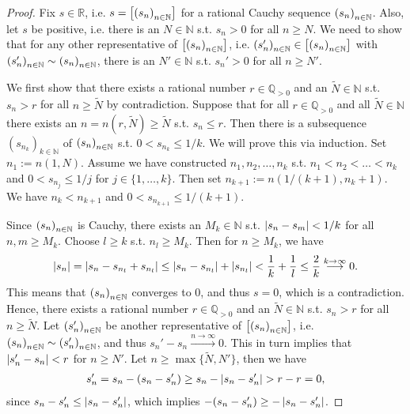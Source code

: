 \begin{proof}
	Fix $s\in\mathbb R$, i.e. $s = \left[\seq[s_n]\right]$ for a rational Cauchy sequence $\seq[s_n]$. Also, let $s$ be positive, i.e. there is an $N\in\mathbb N$ s.t. $s_n > 0$ for all $n\geq N$. We need to show that for any other representative of $\left[\seq[s_n]\right]$, i.e. $\seq[s_n']\in\left[\seq[s_n]\right]$ with $\seq[s_n'] \sim \seq[s_n]$, there is an $N'\in\mathbb N$ s.t. $s_n' > 0$ for all $n\geq N'$.
	
	We first show that there exists a rational number $r\in\mathbb Q_{> 0}$ and an $\tilde{N}\in\mathbb N$ s.t. $s_n > r$ for all $n\geq \tilde{N}$ by contradiction. Suppose that for all $r\in\mathbb Q_{> 0}$ and all $\tilde{N}\in\mathbb N$ there exists an $n = n(r, \tilde{N})\geq \tilde{N}$ s.t. $s_n \leq r$. Then there is a subsequence $\left(s_{n_k}\right)_{k\in\mathbb N}$ of $\seq[s_n]$ s.t. $0 < s_{n_k} \leq 1/k$. We will prove this via induction. Set $n_1 := n(1, N)$. Assume we have constructed $n_1, n_2, \dots, n_k$ s.t. $n_1 < n_2 < \dots < n_k$ and $0 < s_{n_j} \leq 1/j$ for $j\in\{1, \dots, k\}$. Then set $n_{k + 1} := n(1/(k + 1), n_{k} + 1)$. We have $n_k < n_{k + 1}$ and $0 < s_{n_{k + 1}} \leq 1/(k +1)$. 
	
	Since $\seq[s_n]$ is Cauchy, there exists an $M_k\in\mathbb N$ s.t. $\abs{s_n - s_m} < 1/k$ for all $n, m\geq M_k$. Choose $l\geq k$ s.t. $n_l \geq M_k$. Then for $n\geq M_k$, we have
	\begin{align}
		\abs{s_n} = \abs{s_n - s_{n_l} + s_{n_l}} \leq \abs{s_n - s_{n_l}} + \abs{s_{n_l}} < \frac{1}{k} + \frac{1}{l} \leq \frac{2}{k} \overset{k\to\infty}{\longrightarrow} 0.
	\end{align}
	This means that $\seq[s_n]$ converges to $0$, and thus $s = 0$, which is a contradiction. Hence, there exists a rational number $r\in\mathbb Q_{> 0}$ and an $\tilde{N}\in\mathbb N$ s.t. $s_n > r$ for all $n\geq \tilde{N}$. Let $\seq[s_n']$ be another representative of $\left[\seq[s_n]\right]$, i.e. $\seq[s_n] \sim \seq[s_n']$, and thus $s_n' - s_n \overset{n\to\infty}{\longrightarrow} 0$. This in turn implies that $\abs{s_n' - s_n} < r$ for $n\geq N'$. Let $n\geq \max\{\tilde{N}, N'\}$, then we have
	\begin{align*}
		s_n' = s_n - (s_n - s_n') \geq s_n - \abs{s_n - s_n'} > r - r = 0,
	\end{align*}
	since $s_n - s_n' \leq \abs{s_n - s_n'}$, which implies $-(s_n - s_n') \geq - \abs{s_n - s_n'}$.
\end{proof}

